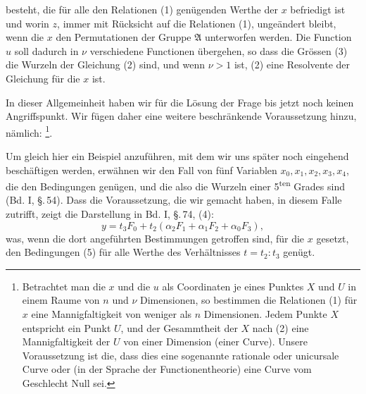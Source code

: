 besteht, die für alle den Relationen (1) genügenden Werthe der $x$
befriedigt ist und worin $z$, immer mit Rücksicht auf die Relationen (1),
ungeändert bleibt, wenn die $x$ den Permutationen der Gruppe
$\mathfrak{A}$ unterworfen werden. Die Function $u$ soll dadurch in
$\nu$ verschiedene Functionen
übergehen, so dass die Grössen (3) die Wurzeln der Gleichung (2) sind, und
wenn $\nu > 1$ ist, (2) eine Resolvente der Gleichung für die $x$ ist.

In dieser Allgemeinheit haben wir für die Lösung der Frage bis jetzt noch
keinen Angriffspunkt. Wir fügen daher eine weitere beschränkende
Voraussetzung hinzu, nämlich: 
\footnote{Betrachtet man die $x$ und die $u$ als Coordinaten je eines
Punktes $X$ und $U$ in einem Raume von $n$ und $\nu$ Dimensionen, so
bestimmen die Relationen (1) für $x$ eine Mannigfaltigkeit von weniger
als $n$ Dimensionen. Jedem Punkte $X$ entspricht ein Punkt $U$, und der
Gesammtheit der $X$ nach (2) eine Mannigfaltigkeit der $U$ von einer
Dimension (einer Curve). Unsere Voraussetzung ist die, dass dies eine
sogenannte rationale oder unicursale Curve oder (in der Sprache der
Functionentheorie) eine Curve vom Geschlecht Null sei.}.

Um gleich hier ein Beispiel anzuführen, mit dem wir uns später noch
eingehend beschäftigen werden, erwähnen wir den Fall von fünf Variablen
$x_0, x_1, x_2, x_3, x_4$, die den Bedingungen
genügen, und die also die Wurzeln einer 
5\textsuperscript{ten} Grades sind (Bd. I, \S.\,54). Dass die
Voraussetzung, die wir gemacht haben, in diesem Falle zutrifft, zeigt die
Darstellung in Bd. I, \S.\,74, (4):
\[
y = t_3 F_0 + t_2(\alpha_2 F_1 + \alpha_1 F_2 + \alpha_0 F_3),
\]
was, wenn die dort angeführten Bestimmungen getroffen sind, für die $x$
gesetzt, den Bedingungen (5) für alle Werthe des Verhältnisses
$t = t_2 : t_3$ genügt.
